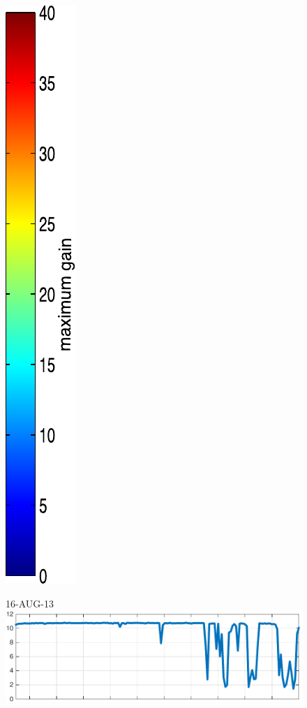 \begin{figure}
\begin{minipage}[c]{\mylength}
\includegraphics[valign=t,trim=2pt -8pt 0 5pt,trim=2pt -8pt 0 5pt,width=\colorbarwidth,totalheight=\eventheight]{events/colorbar-40.pdf}
\end{minipage}
\begin{minipage}[c]{\mylength}
\centering \scriptsize 16-AUG-13 \\
\includegraphics[valign=t,trim=0 0 5pt 0,angle=90,origin=tr,width=\sunintwidth,totalheight=\eventheight]{events/20130816-intensity.pdf}

\end{minipage}
\end{figure}
